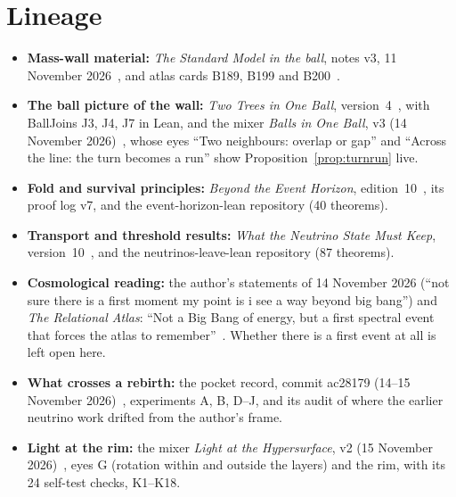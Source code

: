 \documentclass[11pt]{article}
\theoremstyle{definition}\newtheorem{hypothesis}{Hypothesis}\newtheorem{prediction}{Prediction}
\theoremstyle{remark}\newtheorem{remark}[theorem]{Remark}
\begin{document}
\section{Lineage}
\begin{itemize}[nosep]
\item \textbf{Mass-wall material:} \emph{The Standard Model in the ball}, notes v3, 11 November 2026~\cite{SMball}, and atlas cards B189, B199 and B200~\cite{Atlas}.
\item \textbf{The ball picture of the wall:} \emph{Two Trees in One Ball}, version~4~\cite{TwoTrees}, with BallJoins J3, J4, J7 in Lean, and the mixer \emph{Balls in One Ball}, v3 (14 November 2026)~\cite{Mixer}, whose eyes ``Two neighbours: overlap or gap'' and ``Across the line: the turn becomes a run'' show Proposition~\ref{prop:turnrun} live.
\item \textbf{Fold and survival principles:} \emph{Beyond the Event Horizon}, edition~10~\cite{BH}, its proof log v7, and the event-horizon-lean repository (40 theorems).
\item \textbf{Transport and threshold results:} \emph{What the Neutrino State Must Keep}, version~10~\cite{NU10}, and the neutrinos-leave-lean repository (87 theorems).
\item \textbf{Cosmological reading:} the author's statements of 14 November 2026 (``not sure there is a first moment my point is i see a way beyond big bang'') and \emph{The Relational Atlas}: ``Not a Big Bang of energy, but a first spectral event that forces the atlas to remember''~\cite{RelAtlas}. Whether there is a first event at all is left open here.
\item \textbf{What crosses a rebirth:} the pocket record, commit ac28179 (14--15 November 2026)~\cite{Pocket}, experiments A, B, D--J, and its audit of where the earlier neutrino work drifted from the author's frame.
\item \textbf{Light at the rim:} the mixer \emph{Light at the Hypersurface}, v2 (15 November 2026)~\cite{Mixer2}, eyes G (rotation within and outside the layers) and the rim, with its 24 self-test checks, K1--K18.
\end{itemize}
\end{document}
